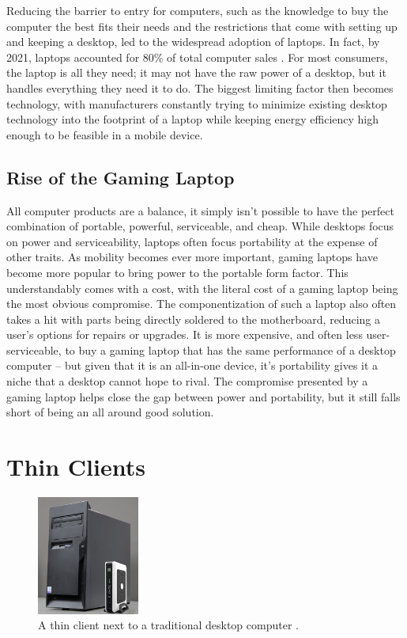 Reducing the barrier to entry for computers, such as the knowledge to buy the computer the best fits their needs and the restrictions that come with setting up and keeping a desktop, led to the widespread adoption of laptops.
In fact, by 2021, laptops accounted for 80\% of total computer sales \cite{idc_2021}.
For most consumers, the laptop is all they need; it may not have the raw power of a desktop, but it handles everything they need it to do.
The biggest limiting factor then becomes technology, with manufacturers constantly trying to minimize existing desktop technology into the footprint of a laptop while keeping energy efficiency high enough to be feasible in a mobile device.


\subsection{Rise of the Gaming Laptop}\label{RiseOfTheGamingLaptop}

All computer products are a balance, it simply isn't possible to have the perfect combination of portable, powerful, serviceable, and cheap.
While desktops focus on power and serviceability, laptops often focus portability at the expense of other traits.
As mobility becomes ever more important, gaming laptops have become more popular to bring power to the portable form factor.
This understandably comes with a cost, with the literal cost of a gaming laptop being the most obvious compromise.
The componentization of such a laptop also often takes a hit with parts being directly soldered to the motherboard, reducing a user's options for repairs or upgrades.
It is more expensive, and often less user-serviceable, to buy a gaming laptop that has the same performance of a desktop computer -- but given that it is an all-in-one device, it's portability gives it a niche that a desktop cannot hope to rival.
The compromise presented by a gaming laptop helps close the gap between power and portability, but it still falls short of being an all around good solution.


\section{Thin Clients}\label{ThinClients}

\begin{figure}
  \centering
  \includegraphics[width=0.3\textwidth]{Figures/ClientronU700}
  \caption[Thin Client]{A thin client next to a traditional desktop computer \cite{ImageThinClient}.}
  \label{fig:ThinClient}
\end{figure}


